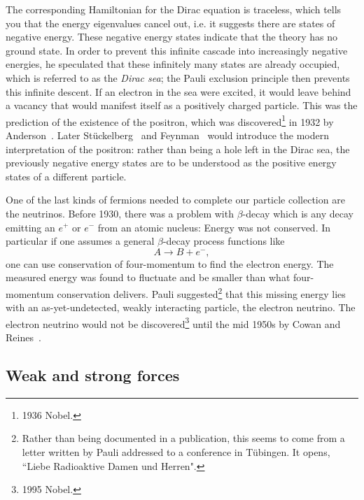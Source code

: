 The corresponding Hamiltonian for the Dirac equation is traceless, which
tells you that the energy eigenvalues cancel out, i.e. 
it suggests there are states of
negative energy. These negative energy states indicate that the theory
has no ground state. In order to prevent this infinite cascade into increasingly
negative energies, he speculated that these infinitely many states are already
occupied, which is referred to as the {\it Dirac sea}; 
the Pauli exclusion principle then prevents this infinite descent. 
If an electron in the sea were excited, it would leave behind a vacancy
that would manifest itself as a positively charged particle. This was the
prediction of the existence of the positron, which
was discovered\footnote{1936 Nobel.} in 1932 by Anderson~\cite{Anderson:1933mb}.
Later St\"uckelberg~\cite{Stueckelberg:1941rg} and
Feynman~\cite{feynman_theory_1949} would introduce the modern interpretation
of the positron: rather than being a hole left in the Dirac sea,
the previously negative energy states are to be understood as the
positive energy states of a different particle.


One of the last kinds of fermions needed to complete our particle collection
are the neutrinos. Before 1930, there was a problem with $\beta$-decay
which is any decay emitting an $e^+$ or $e^-$ from
an atomic nucleus: Energy was not conserved. In particular if one assumes
a general $\beta$-decay process functions like
\begin{equation}
  A\to B+e^-,
\end{equation}
one can use conservation of four-momentum to find the electron energy.
The measured energy was found to fluctuate and be smaller than what four-momentum
conservation delivers. Pauli
suggested\footnote{Rather than being documented in a publication, this seems to
come from a letter written by Pauli addressed to a conference in T\"ubingen.
It opens, ``Liebe Radioaktive Damen und Herren".} that this missing energy
lies with an as-yet-undetected, weakly interacting particle, the
electron neutrino. The electron neutrino would not be 
discovered\footnote{1995 Nobel.}
until the mid 1950s by Cowan and Reines~\cite{Cowan:1956rrn}.

\subsection{Weak and strong forces}

